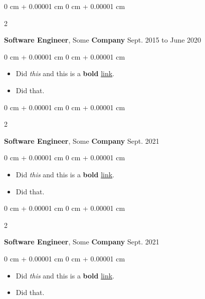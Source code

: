 \documentclass[10pt, letterpaper]{article}
\newenvironment{highlights}{
    \begin{itemize}[
        topsep=0.10 cm,
        parsep=0.10 cm,
        partopsep=0pt,
        itemsep=0pt,
        leftmargin=0 cm + 10pt
    ]
}{
    \end{itemize}
} %
\newenvironment{onecolentry}{
    \begin{adjustwidth}{
        0 cm + 0.00001 cm
    }{
        0 cm + 0.00001 cm
    }
}{
    \end{adjustwidth}
} %
\newenvironment{twocolentry}[2][]{
    \onecolentry
    \def\secondColumn{#2}
    \setcolumnwidth{\fill, 4.5 cm}
    \begin{paracol}{2}
}{
    \switchcolumn \raggedleft \secondColumn
    \end{paracol}
    \endonecolentry
} %
\begin{document}
        \vspace{0.2 cm}

        \begin{twocolentry}{
            Sept. 2015 to June 2020
        }
            \textbf{Software Engineer}, Some \textbf{Company}\end{twocolentry}

        \vspace{0.10 cm}
        \begin{onecolentry}
            \begin{highlights}
                \item Did \textit{this} and this is a \textbf{bold} \href{https://example.com}{link}.
                \item Did that.
            \end{highlights}
        \end{onecolentry}


        \vspace{0.2 cm}

        \begin{twocolentry}{
            Sept. 2021
        }
            \textbf{Software Engineer}, Some \textbf{Company}\end{twocolentry}

        \vspace{0.10 cm}
        \begin{onecolentry}
            \begin{highlights}
                \item Did \textit{this} and this is a \textbf{bold} \href{https://example.com}{link}.
                \item Did that.
            \end{highlights}
        \end{onecolentry}


        \vspace{0.2 cm}

        \begin{twocolentry}{
            Sept. 2021
        }
            \textbf{Software Engineer}, Some \textbf{Company}\end{twocolentry}

        \vspace{0.10 cm}
        \begin{onecolentry}
            \begin{highlights}
                \item Did \textit{this} and this is a \textbf{bold} \href{https://example.com}{link}.
                \item Did that.
            \end{highlights}
        \end{onecolentry}
\end{document}

